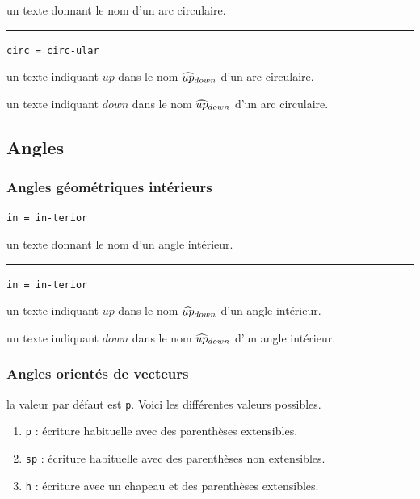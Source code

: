 \documentclass[12pt,a4paper]{book}
\theoremstyle{definition}
\newcommand\separation{
	\medskip
	\hfill\rule{0.5\textwidth}{0.75pt}\hfill
	\medskip
}
\newcommand\mwhyprefix[2]{%
	\texttt{#1 = #1-#2}%
}
\begin{document}
{{\IDarg{} un texte donnant le nom d'un arc circulaire.


\separation


 \hfill \mwhyprefix{circ}{ular}

 un texte indiquant $up$ dans le nom $\circarc*{up}{down}$ d'un arc circulaire.

 un texte indiquant $down$ dans le nom $\circarc*{up}{down}$ d'un arc circulaire.


\subsection{Angles}

\subsubsection{Angles géométriques \og intérieurs \fg}



 \hfill \mwhyprefix{in}{terior}

\IDarg{} un texte donnant le nom d'un angle intérieur.


\separation


 \hfill \mwhyprefix{in}{terior}

 un texte indiquant $up$ dans le nom $\anglein*{up}{down}$ d'un angle intérieur.

 un texte indiquant $down$ dans le nom $\anglein*{up}{down}$ d'un angle intérieur.


\subsubsection{Angles orientés de vecteurs}




\IDoption{} la valeur par défaut est \verb+p+.  Voici les différentes valeurs possibles.
\begin{enumerate}
	\item \verb+p+ : écriture habituelle avec des parenthèses extensibles.

	\item \verb+sp+ : écriture habituelle avec des parenthèses non extensibles.

	\item \verb+h+ : écriture avec un chapeau et des parenthèses extensibles.


\end{enumerate}}}
\end{document}
